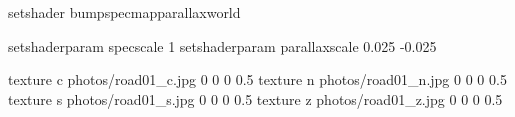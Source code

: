 setshader bumpspecmapparallaxworld

setshaderparam specscale 1
setshaderparam parallaxscale 0.025 -0.025

texture c photos/road01_c.jpg 0 0 0 0.5
texture n photos/road01_n.jpg 0 0 0 0.5
texture s photos/road01_s.jpg 0 0 0 0.5
texture z photos/road01_z.jpg 0 0 0 0.5
